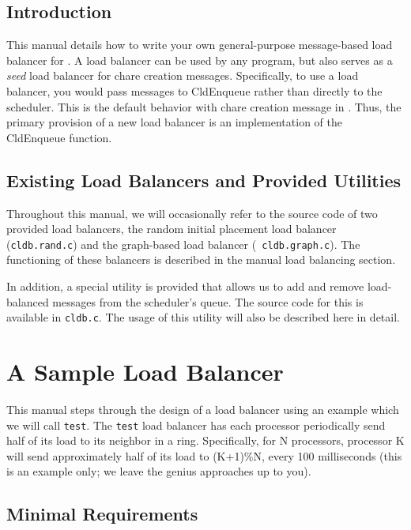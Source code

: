 \subsection{Introduction}

This manual details how to write your own general-purpose
message-based load balancer for \converse{}.
A \converse{} load balancer can be used by any \converse{} program, but also
serves as a {\sl seed} load balancer for \charmpp{} chare creation messages.
Specifically, to use a load balancer, you would pass messages to
CldEnqueue rather than directly to the scheduler.  This is the default
behavior with chare creation message in \charmpp{}.  Thus, the primary
provision of a new load balancer is an implementation of the
CldEnqueue function.

\subsection{Existing Load Balancers and Provided Utilities}

Throughout this manual, we will occasionally refer to the source code
of two provided load balancers, the random initial placement load balancer
({\tt cldb.rand.c}) and the graph-based load balancer ({\tt
cldb.graph.c}).  The functioning of these balancers is described in
the \charmpp{} manual load balancing section.

In addition, a special utility is provided that allows us to add and
remove load-balanced messages from the scheduler's queue.  The source
code for this is available in {\tt cldb.c}.  The usage of this utility
will also be described here in detail.

\section{A Sample Load Balancer}

This manual steps through the design of a load balancer using an
example which we will call {\tt test}.  The {\tt test} load balancer
has each processor periodically send half of its load to its neighbor
in a ring.  Specifically, for N processors, processor K will send
approximately half of its load to (K+1)\%N, every 100 milliseconds
(this is an example only; we leave the genius approaches up to you).

\subsection{Minimal Requirements}

